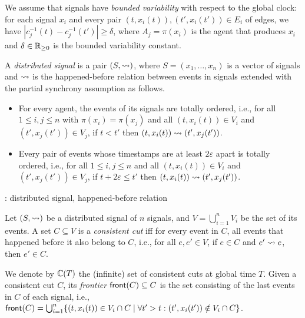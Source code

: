 We assume that signals have \emph{bounded variability} with respect to the global clock: for each 
signal $x_i$ and every pair $(t, x_i(t)), (t', x_i(t')) \in E_i$ of edges, we have $|c_j^{-1}(t) - 
c_j^{-1}(t')| \geq \delta$, where $A_j = \pi(x_i)$ is the agent that produces $x_i$ and $\delta \in 
\mathbb{R}_{\geq 0}$ is the bounded variability constant. 

\begin{definition} \label{defn:hb}
	A \emph{distributed signal} is a pair $(S, {\rightsquigarrow})$, where $S = (x_1, \ldots, x_n)$ is a vector of 
	signals and ${\rightsquigarrow}$ is the happened-before relation between events in signals extended with the 
	partial synchrony assumption as follows.
	\begin{itemize}
		\item For every agent, the events of its signals are totally ordered, i.e., for all $1 \leq i,j \leq n$ 
		with $\pi(x_i) = \pi(x_j)$ and all $(t, x_i(t)) \in V_i$ and $(t', x_j(t')) \in V_j$, if $t < t'$ then $(t, 
		x_i(t)) \rightsquigarrow (t', x_j(t'))$.
		\item Every pair of events whose timestamps are at least $2 \varepsilon$ apart is totally ordered, i.e., for all $1 \leq i,j \leq n$ and all $(t, x_i(t)) \in V_i$ and $(t', x_j(t')) \in V_j$, if $t + 2\varepsilon \leq t'$ then $(t, x_i(t)) \rightsquigarrow (t', x_j(t'))$.
	\end{itemize}
\end{definition}

\begin{example}
	\TODO: distributed signal, happened-before relation
\end{example}

\begin{definition}
	Let $(S, {\rightsquigarrow})$ be a distributed signal of $n$ signals, and $V = \bigcup_{i = 1}^{n} V_i$ be the set of its events.
	A set $C \subseteq V$ is a \emph{consistent cut} iff for every event in $C$, all events that happened before  it also belong to $C$, i.e., for all $e, e' \in V$, if $e \in C$ and $e' \rightsquigarrow e$, then $e' \in C$.
\end{definition}

We denote by $\mathbb{C}(T)$ the (infinite) set of consistent cuts at global time $T$.
Given a consistent cut $C$, its \emph{frontier} $\mathsf{front}(C) \subseteq C$ is the set consisting of the last events in $C$ of each signal, i.e., $\fr(C) = \bigcup_{i = 1}^{n} \{ (t, x_i(t)) \in V_i \cap C \st \forall t' > t : (t', x_i(t')) \notin V_i \cap C \}$.

